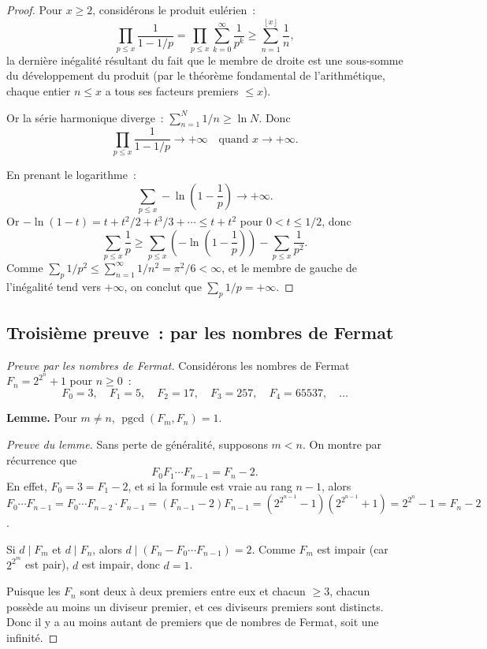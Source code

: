 \documentclass[12pt,a4paper,openany]{book}
\theoremstyle{definition}
\theoremstyle{plain}
\theoremstyle{remark}
\newcommand{\floor}[1]{\left\lfloor #1 \right\rfloor}
\DeclareMathOperator{\pgcd}{pgcd}
\begin{document}
\begin{proof}
Pour $x \geq 2$, considérons le produit eulérien~:
\[
  \prod_{p \leq x} \frac{1}{1 - 1/p}
  = \prod_{p \leq x} \sum_{k=0}^{\infty} \frac{1}{p^k}
  \geq \sum_{n=1}^{\floor{x}} \frac{1}{n},
\]
la dernière inégalité résultant du fait que le membre de droite est une sous-somme du
développement du produit (par le théorème fondamental de l'arithmétique, chaque entier
$n \leq x$ a tous ses facteurs premiers $\leq x$).

Or la série harmonique diverge~: $\sum_{n=1}^{N} 1/n \geq \ln N$. Donc
\[
  \prod_{p \leq x} \frac{1}{1 - 1/p} \to +\infty \quad \text{quand } x \to +\infty.
\]

En prenant le logarithme~:
\[
  \sum_{p \leq x} -\ln\!\left(1 - \frac{1}{p}\right) \to +\infty.
\]
Or $-\ln(1 - t) = t + t^2/2 + t^3/3 + \cdots \leq t + t^2$ pour $0 < t \leq 1/2$,
donc
\[
  \sum_{p \leq x} \frac{1}{p} \geq \sum_{p \leq x} \left(-\ln\!\left(1-\frac{1}{p}\right)\right) - \sum_{p \leq x} \frac{1}{p^2}.
\]
Comme $\sum_{p} 1/p^2 \leq \sum_{n=1}^{\infty} 1/n^2 = \pi^2/6 < \infty$, et le
membre de gauche de l'inégalité tend vers $+\infty$, on conclut que
$\sum_{p} 1/p = +\infty$.
\end{proof}

\subsection{Troisième preuve~: par les nombres de Fermat}
\label{subsec:ch2:preuve3}


\begin{proof}[Preuve par les nombres de Fermat]
Considérons les nombres de Fermat $F_n = 2^{2^n} + 1$ pour $n \geq 0$~:
\[
  F_0 = 3, \quad F_1 = 5, \quad F_2 = 17, \quad F_3 = 257, \quad F_4 = 65537, \quad \ldots
\]

\textbf{Lemme.} Pour $m \neq n$, $\pgcd(F_m, F_n) = 1$.

\emph{Preuve du lemme.} Sans perte de généralité, supposons $m < n$. On montre
par récurrence que
\[
  F_0 F_1 \cdots F_{n-1} = F_n - 2.
\]
En effet, $F_0 = 3 = F_1 - 2$, et si la formule est vraie au rang $n-1$, alors
$F_0 \cdots F_{n-1} = F_0 \cdots F_{n-2} \cdot F_{n-1} = (F_{n-1}-2) F_{n-1}
= (2^{2^{n-1}}-1)(2^{2^{n-1}}+1) = 2^{2^n}-1 = F_n - 2$.

Si $d \mid F_m$ et $d \mid F_n$, alors $d \mid (F_n - F_0 \cdots F_{n-1}) = 2$.
Comme $F_m$ est impair (car $2^{2^m}$ est pair), $d$ est impair, donc $d = 1$.

\medskip

Puisque les $F_n$ sont deux à deux premiers entre eux et chacun $\geq 3$, chacun
possède au moins un diviseur premier, et ces diviseurs premiers sont distincts. Donc
il y a au moins autant de premiers que de nombres de Fermat, soit une infinité.
\end{proof}
\end{document}
